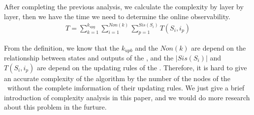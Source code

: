 After completing the previous analysis, we calculate the complexity by layer by layer, then we have the time we need to determine the online observability.  
\begin{equation}
\begin{split}
T=\sum_{k=1}^{k_{upg}}\sum_{i=1}^{Non(k)}\sum_{p=1}^{Sis(S_i)}T(S_i, i_p)
\end{split}
\end{equation}



From the definition, we know that the $k_{upb}$ and the $Non(k)$ are depend on the relationship between states and outputs of the \BCNs, and the $|Sis(S_i)|$ and $T(S_i, i_p)$ are depend on the updating rules of the \BCNs. Therefore, it is hard to give an accurate complexity of the algorithm by the number of the nodes of the \BCNs\ without the complete imformation of their updating rules. We just give a brief introduction of complexity analysis in this paper, and we would do more research about this problem in the furture.

